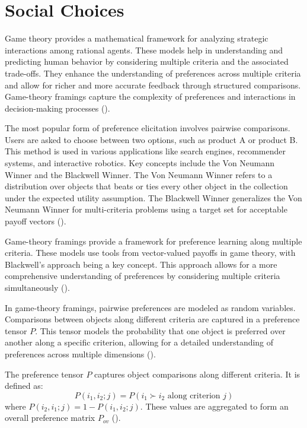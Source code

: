 \documentclass[
  letterpaper,
  DIV=11,
  numbers=noendperiod,
  oneside]{scrreprt}
\theoremstyle{remark}
\begin{document}
\section{Social Choices}\label{social-choices}

Game theory provides a mathematical framework for analyzing strategic
interactions among rational agents. These models help in understanding
and predicting human behavior by considering multiple criteria and the
associated trade-offs. They enhance the understanding of preferences
across multiple criteria and allow for richer and more accurate feedback
through structured comparisons. Game-theory framings capture the
complexity of preferences and interactions in decision-making processes
().

The most popular form of preference elicitation involves pairwise
comparisons. Users are asked to choose between two options, such as
product A or product B. This method is used in various applications like
search engines, recommender systems, and interactive robotics. Key
concepts include the Von Neumann Winner and the Blackwell Winner. The
Von Neumann Winner refers to a distribution over objects that beats or
ties every other object in the collection under the expected utility
assumption. The Blackwell Winner generalizes the Von Neumann Winner for
multi-criteria problems using a target set for acceptable payoff vectors
().

Game-theory framings provide a framework for preference learning along
multiple criteria. These models use tools from vector-valued payoffs in
game theory, with Blackwell's approach being a key concept. This
approach allows for a more comprehensive understanding of preferences by
considering multiple criteria simultaneously
().

In game-theory framings, pairwise preferences are modeled as random
variables. Comparisons between objects along different criteria are
captured in a preference tensor \(P\). This tensor models the
probability that one object is preferred over another along a specific
criterion, allowing for a detailed understanding of preferences across
multiple dimensions ().

The preference tensor \(P\) captures object comparisons along different
criteria. It is defined as:
\[P(i_1, i_2; j) = P(i_1 \succ i_2 \text{ along criterion } j)\] where
\(P(i_2, i_1; j) = 1 - P(i_1, i_2; j)\). These values are aggregated to
form an overall preference matrix \(P_{ov}\)
().
\end{document}
